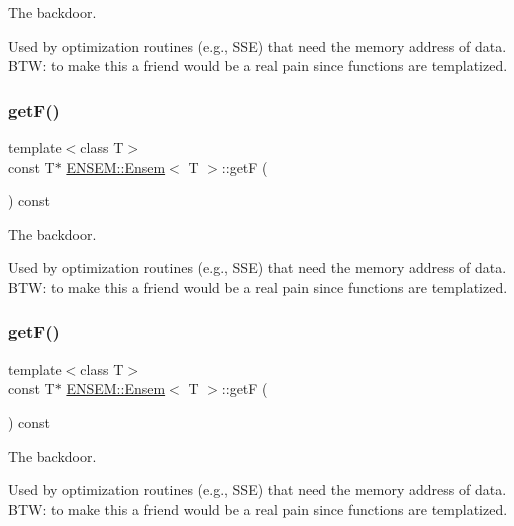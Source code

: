 The backdoor. 

Used by optimization routines (e.\+g., S\+SE) that need the memory address of data. B\+TW\+: to make this a friend would be a real pain since functions are templatized. \mbox{\label{classENSEM_1_1Ensem_ad2cb7a34934bedeaa29f49c78cdb8371}} 
\subsubsection{\texorpdfstring{getF()}{getF()}\hspace{0.1cm}{\footnotesize\ttfamily [2/6]}}
{\footnotesize\ttfamily template$<$class T$>$ \\
const T$\ast$ \mbox{\hyperlink{classENSEM_1_1Ensem}{E\+N\+S\+E\+M\+::\+Ensem}}$<$ T $>$\+::getF (\begin{DoxyParamCaption}{ }\end{DoxyParamCaption}) const\hspace{0.3cm}{\ttfamily [inline]}}



The backdoor. 

Used by optimization routines (e.\+g., S\+SE) that need the memory address of data. B\+TW\+: to make this a friend would be a real pain since functions are templatized. \mbox{\label{classENSEM_1_1Ensem_ad2cb7a34934bedeaa29f49c78cdb8371}} 
\subsubsection{\texorpdfstring{getF()}{getF()}\hspace{0.1cm}{\footnotesize\ttfamily [3/6]}}
{\footnotesize\ttfamily template$<$class T$>$ \\
const T$\ast$ \mbox{\hyperlink{classENSEM_1_1Ensem}{E\+N\+S\+E\+M\+::\+Ensem}}$<$ T $>$\+::getF (\begin{DoxyParamCaption}{ }\end{DoxyParamCaption}) const\hspace{0.3cm}{\ttfamily [inline]}}



The backdoor. 

Used by optimization routines (e.\+g., S\+SE) that need the memory address of data. B\+TW\+: to make this a friend would be a real pain since functions are templatized. \mbox{\label{classENSEM_1_1Ensem_ab2909a7d9b171d7e2ba7365c5e962aa6}} 
